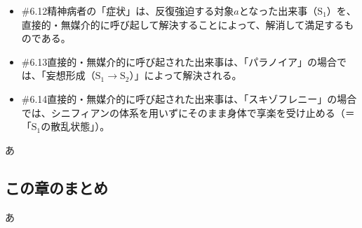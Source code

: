\begin{note}{}
\begin{itemize}
    \item{\#6.12}精神病者の「症状」は、反復強迫する対象$a$となった出来事（$\textrm{S}_1$）を、直接的・無媒介的に呼び起して解決することによって、解消して満足するものである。
    \item{\#6.13}直接的・無媒介的に呼び起された出来事は、「パラノイア」の場合では、「妄想形成（$\textrm{S}_1\rightarrow\textrm{S}_2$）」によって解決される。
    \item{\#6.14}直接的・無媒介的に呼び起された出来事は、「スキゾフレニー」の場合では、シニフィアンの体系を用いずにそのまま身体で享楽を受け止める（＝「$\textrm{S}_1$の散乱状態」）。
  \end{itemize}
\end{note}

あ

\subsection{この章のまとめ}\label{ux3053ux306eux7ae0ux306eux307eux3068ux3081}

あ
